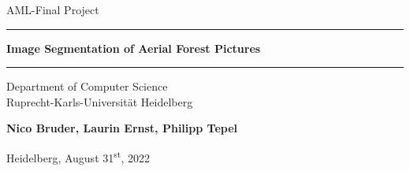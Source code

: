 \begin{titlepage}
    \begin{center}

    \LARGE
    AML-Final Project

    \vspace{0.5cm}

    \rule{\textwidth}{1.5pt}
    \LARGE
    \textbf{Image Segmentation of Aerial Forest Pictures}
    \rule{\textwidth}{1.5pt}

    \vspace{0.5cm}

    \large
    Department of Computer Science \\
    Ruprecht-Karls-Universität Heidelberg
    \vfill

    \Large
    \textbf{Nico Bruder, Laurin Ernst, Philipp Tepel}

    \vfill

    \large
    Heidelberg, August 31\textsuperscript{st}, 2022

    \vfill

    \end{center}
    \end{titlepage}
